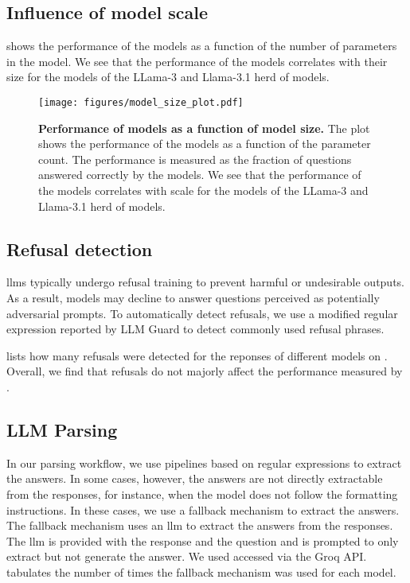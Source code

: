 \clearpage
\subsection{Influence of model scale}
 shows the performance of the models as a function of the number of parameters in the model.
We see that the performance of the models correlates with their size for the models of the LLama-3 and Llama-3.1 herd of models.

\begin{figure}[!h]
    \centering
    \texttt{[image: figures/model\_size\_plot.pdf]}
    \caption{\textbf{Performance of models as a function of model size.} The plot shows the performance of the models as a function of the parameter count. The performance is measured as the fraction of questions answered correctly by the models. We see that the performance of the models correlates with scale for the models of the LLama-3 and Llama-3.1 herd of models.}
    \label{fig:model_size_plot}
\end{figure}


\clearpage
\subsection{Refusal detection}
\Glspl{llm} typically undergo refusal training to prevent harmful or undesirable outputs. As a result, models may decline to answer questions perceived as potentially adversarial prompts.
To automatically detect refusals, we use a modified regular expression reported by LLM Guard\autocite{llmguard} to detect commonly used refusal phrases.

 lists how many refusals were detected for the reponses of different models on \chembench. Overall, we find that refusals do not majorly affect the performance measured by \chembench.


\subsection{LLM Parsing} \label{sec:llm-parsing}

In our parsing workflow, we use pipelines based on regular expressions to extract the answers. In some cases, however, the answers are not directly extractable from the responses, for instance, when the model does not follow the formatting instructions. In these cases, we use a fallback mechanism to extract the answers. The fallback mechanism uses an \gls{llm} to extract the answers from the responses. The \gls{llm} is provided with the response and the question and is prompted to only extract but not generate the answer. We used \LlamaThreeSeventyBInstruct accessed via the Groq API.
 tabulates the number of times the fallback mechanism was used for each model.


